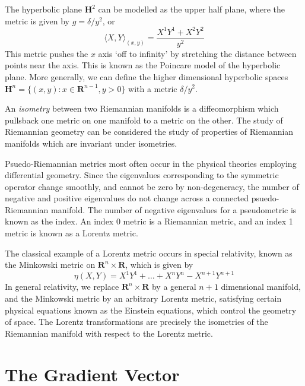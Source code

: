 \begin{example}
    The hyperbolic plane $\mathbf{H}^2$ can be modelled as the upper half plane, where the metric is given by $g = \delta/y^2$, or
    \[ \langle X, Y \rangle_{(x,y)} = \frac{X^1Y^1 + X^2Y^2}{y^2} \]
    This metric pushes the $x$ axis `off to infinity' by stretching the distance between points near the axis. This is known as the Poincare model of the hyperbolic plane. More generally, we can define the higher dimensional hyperbolic spaces $\mathbf{H}^n = \{ (x,y): x \in \mathbf{R}^{n-1}, y > 0 \}$ with a metric $\delta/y^2$.
\end{example}

An \emph{isometry} between two Riemannian manifolds is a diffeomorphism which pullsback one metric on one manifold to a metric on the other. The study of Riemannian geometry can be considered the study of properties of Riemannian manifolds which are invariant under isometries.

Psuedo-Riemannian metrics most often occur in the physical theories employing differential geometry. Since the eigenvalues corresponding to the symmetric operator change smoothly, and cannot be zero by non-degeneracy, the number of negative and positive eigenvalues do not change across a connected psuedo-Riemannian manifold. The number of negative eigenvalues for a pseudometric is known as the index. An index 0 metric is a Riemannian metric, and an index 1 metric is known as a Lorentz metric.

\begin{example}
    The classical example of a Lorentz metric occurs in special relativity, known as the Minkowski metric on $\mathbf{R}^n \times \mathbf{R}$, which is given by
    \[ \eta(X,Y) = X^1Y^1 + \dots + X^nY^n - X^{n+1}Y^{n+1} \]
    In general relativity, we replace $\mathbf{R}^n \times \mathbf{R}$ by a general $n+1$ dimensional manifold, and the Minkowski metric by an arbitrary Lorentz metric, satisfying certain physical equations known as the Einstein equations, which control the geometry of space. The Lorentz transformations are precisely the isometries of the Riemannian manifold with respect to the Lorentz metric.
\end{example}

\section{The Gradient Vector}

